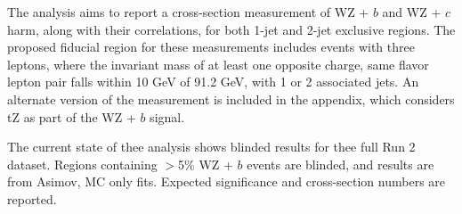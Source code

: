 The analysis aims to report a cross-section measurement of WZ + $b$ and WZ + $c$harm, along with their correlations, for both 1-jet and 2-jet exclusive regions. The proposed fiducial region for these measurements includes events with three leptons, where the invariant mass of at least one opposite charge, same flavor lepton pair falls within 10 GeV of 91.2 GeV, with 1 or 2 associated jets. An alternate version of the measurement is included in the appendix, which considers tZ as part of the WZ + $b$ signal.

The current state of thee analysis shows blinded results for thee full Run 2 dataset. Regions containing $>$5\% WZ + $b$ events are blinded, and results are from Asimov, MC only fits. Expected significance and cross-section numbers are reported.

